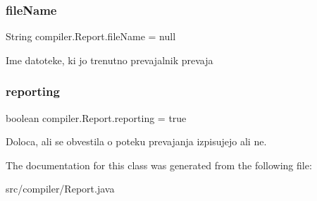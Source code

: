 \subsubsection{\texorpdfstring{file\+Name}{fileName}}
{\footnotesize\ttfamily String compiler.\+Report.\+file\+Name = null\hspace{0.3cm}{\ttfamily [static]}}

Ime datoteke, ki jo trenutno prevajalnik prevaja \mbox{\label{classcompiler_1_1_report_a8a933130e804102873fdc6ea9c926daf}} 
\subsubsection{\texorpdfstring{reporting}{reporting}}
{\footnotesize\ttfamily boolean compiler.\+Report.\+reporting = true\hspace{0.3cm}{\ttfamily [static]}}

Doloca, ali se obvestila o poteku prevajanja izpisujejo ali ne. 

The documentation for this class was generated from the following file\+:\begin{DoxyCompactItemize}
\item 
src/compiler/Report.\+java\end{DoxyCompactItemize}
